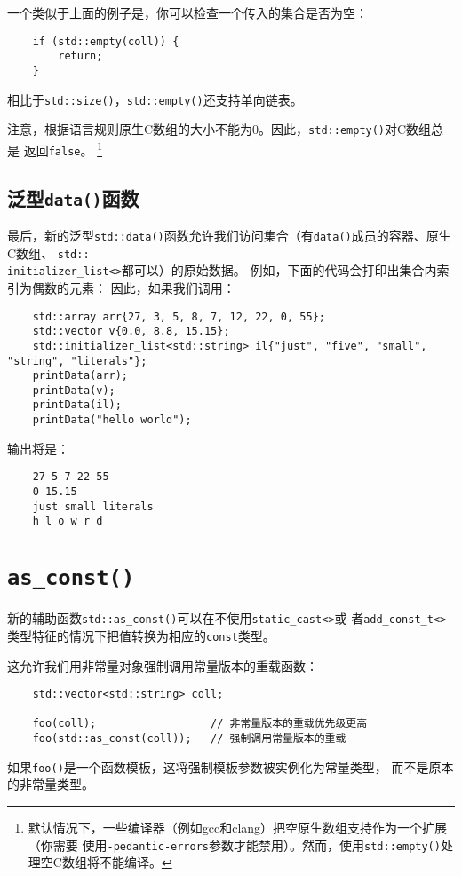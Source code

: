 一个类似于上面的例子是，你可以检查一个传入的集合是否为空：
\begin{lstlisting}
    if (std::empty(coll)) {
        return;
    }
\end{lstlisting}
相比于\texttt{std::size()}，\texttt{std::empty()}还支持单向链表。

注意，根据语言规则原生C数组的大小不能为0。因此，\texttt{std::empty()}对C数组总是
返回\texttt{false}。
\footnote{默认情况下，一些编译器（例如gcc和clang）把空原生数组支持作为一个扩展（你需要
使用\texttt{-pedantic-errors}参数才能禁用）。然而，使用\texttt{std::empty()}处理空C数组将不能编译。}

\subsection{泛型\texttt{data()}函数}
最后，新的泛型\texttt{std::data()}函数允许我们访问集合（有\texttt{data()}成员的容器、原生C数组、
\texttt{std::\\
initializer\_list<>}都可以）的原始数据。
例如，下面的代码会打印出集合内索引为偶数的元素：
因此，如果我们调用：
\begin{lstlisting}
    std::array arr{27, 3, 5, 8, 7, 12, 22, 0, 55};
    std::vector v{0.0, 8.8, 15.15};
    std::initializer_list<std::string> il{"just", "five", "small", "string", "literals"};
    printData(arr);
    printData(v);
    printData(il);
    printData("hello world");
\end{lstlisting}
输出将是：
\begin{lstlisting}
    27 5 7 22 55
    0 15.15
    just small literals
    h l o w r d
\end{lstlisting}


\section{\texttt{as\_const()}}
新的辅助函数\texttt{std::as\_const()}可以在不使用\texttt{static\_cast<>}或
者\texttt{add\_const\_t<>}类型特征的情况下把值转换为相应的\texttt{const}类型。

这允许我们用非常量对象强制调用常量版本的重载函数：
\begin{lstlisting}
    std::vector<std::string> coll;

    foo(coll);                  // 非常量版本的重载优先级更高
    foo(std::as_const(coll));   // 强制调用常量版本的重载
\end{lstlisting}
如果\texttt{foo()}是一个函数模板，这将强制模板参数被实例化为常量类型，
而不是原本的非常量类型。

